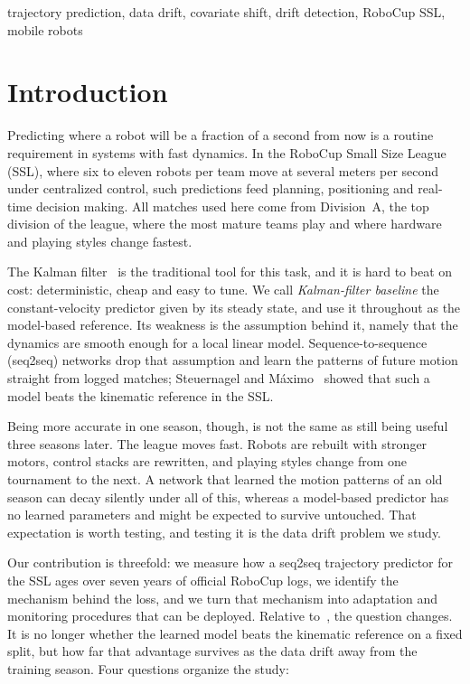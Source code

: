 \documentclass[conference]{IEEEtran}
\begin{document}
\begin{IEEEkeywords}
trajectory prediction, data drift, covariate shift, drift detection,
RoboCup SSL, mobile robots
\end{IEEEkeywords}

\section{Introduction}
\label{sec:intro}

Predicting where a robot will be a fraction of a second from now is a routine
requirement in systems with fast dynamics. In the RoboCup Small Size League
(SSL), where six to eleven robots per team move at several meters per second
under centralized control, such predictions feed planning, positioning and
real-time decision making. All matches used here come from Division~A, the top
division of the league, where the most mature teams play and where hardware and
playing styles change fastest.

The Kalman filter~\cite{kalman} is the traditional tool for this task, and it
is hard to beat on cost: deterministic, cheap and easy to tune. We call
\emph{Kalman-filter baseline} the constant-velocity predictor given by its
steady state, and use it throughout as the model-based reference. Its weakness
is the assumption behind it, namely that the dynamics are smooth enough for a
local linear model. Sequence-to-sequence (seq2seq) networks drop that
assumption and learn the patterns of future motion straight from logged
matches; Steuernagel and M\'aximo~\cite{seq2seq} showed that such a model beats
the kinematic reference in the SSL.

Being more accurate in one season, though, is not the same as still being
useful three seasons later. The league moves fast. Robots are rebuilt with
stronger motors, control stacks are rewritten, and playing styles change from
one tournament to the next. A network that learned the motion patterns of an
old season can decay silently under all of this, whereas a model-based
predictor has no learned parameters and might be expected to survive untouched.
That expectation is worth testing, and testing it is the data drift problem we
study.

Our contribution is threefold: we measure how a seq2seq trajectory predictor
for the SSL ages over seven years of official RoboCup logs, we identify the
mechanism behind the loss, and we turn that mechanism into adaptation and
monitoring procedures that can be deployed. Relative to~\cite{seq2seq}, the
question changes. It is no longer whether the learned model beats the kinematic
reference on a fixed split, but how far that advantage survives as the data
drift away from the training season. Four questions organize the study:
\end{document}
